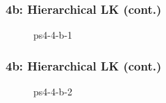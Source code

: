 \documentclass[../report.tex]{subfiles}
\begin{document}
    \begin{frame}
        \frametitle{4b: Hierarchical LK (cont.)}
        \begin{figure}[!htb]
            \centering
            \caption{ps4-4-b-1}
        \end{figure}
    \end{frame}

    \begin{frame}
        \frametitle{4b: Hierarchical LK (cont.)}
        \begin{figure}[!htb]
            \centering
            \caption{ps4-4-b-2}
        \end{figure}
    \end{frame}
    
\end{document}
